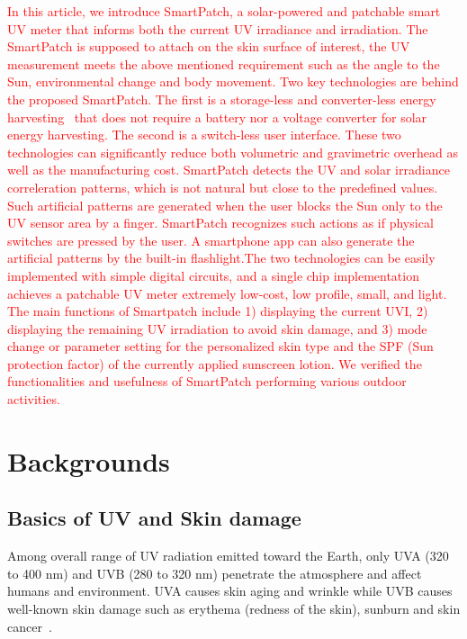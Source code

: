 \documentclass[journal]{IEEEtran}
\begin{document}
\textcolor{red}{In this article, we introduce SmartPatch, a solar-powered  and patchable smart UV meter that informs both the current UV irradiance and irradiation. The SmartPatch is supposed to attach on the skin surface of interest, the UV measurement meets the above mentioned requirement such as the angle to the Sun, environmental change and body movement.  Two key technologies are behind the proposed SmartPatch. The first is a storage-less and converter-less energy harvesting~\cite{Lee:ASPDAC15} that does not require a battery nor a voltage converter for solar  energy harvesting. The second is a switch-less user interface. These two technologies can significantly reduce both volumetric and gravimetric overhead as well as the manufacturing cost. SmartPatch detects the UV and solar irradiance correleration patterns, which is not natural but close to the predefined values. Such artificial patterns are generated when the user blocks the Sun only to the UV sensor area by a finger. SmartPatch recognizes such actions as if physical switches are pressed by the user. A smartphone app can also generate the artificial patterns by the built-in flashlight.The two technologies can be easily implemented with simple digital circuits, and a single chip implementation achieves a patchable UV meter extremely low-cost, low profile, small, and light.\\
% 
The main functions of Smartpatch include 1) displaying the current UVI, 2) displaying the remaining UV irradiation to avoid skin damage, and 3) mode change or parameter setting for the personalized skin type and the SPF (Sun protection factor) of the currently applied sunscreen lotion. We verified the functionalities and usefulness of SmartPatch performing various outdoor activities.}


\section{Backgrounds}
\subsection{Basics of UV and Skin damage}

Among overall range of UV radiation emitted toward the Earth, only UVA (320 to 400 nm) and UVB (280 to 320 nm) penetrate the atmosphere and affect humans and environment. UVA causes skin aging and wrinkle while UVB causes well-known skin damage such as erythema (redness of the skin), sunburn and skin cancer~\cite{Matsumura:TAP04}.
\end{document}
